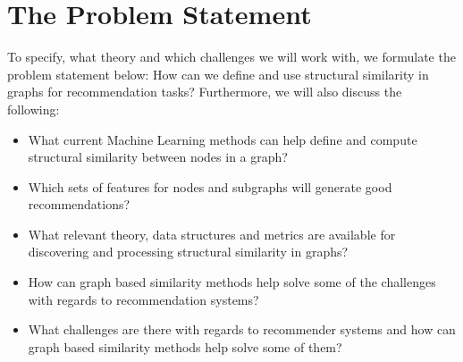 \section{The Problem Statement}
  To specify, what theory and which challenges we will work with, we formulate the problem statement below:
  How can we define and use structural similarity in graphs for recommendation tasks?
  Furthermore, we will also discuss the following:
  \begin{itemize}
    \item What current Machine Learning methods can help define and compute structural similarity between nodes in a graph?
    \item Which sets of features for nodes and subgraphs will generate good recommendations?
    \item What relevant theory, data structures and metrics are available for discovering and processing structural similarity in graphs?
    \item How can graph based similarity methods help solve some of the challenges with regards to recommendation systems?
    \item What challenges are there with regards to recommender systems and how can graph based similarity methods help solve some of them?
  \end{itemize}
